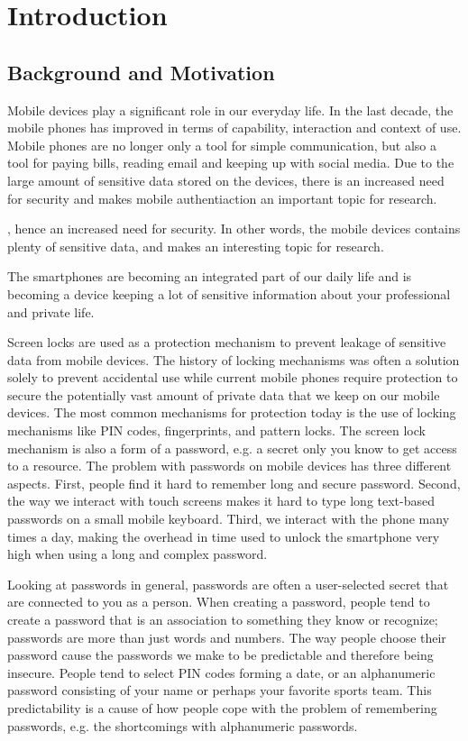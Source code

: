 \chapter{Introduction}\label{chap:introduction}
	
	\clearpage
	\section{Background and Motivation} \label{sec:backgroundandmotivation}
		Mobile devices play a significant role in our everyday life. In the last decade, the mobile phones has improved in terms of capability, interaction and context of use. Mobile phones are no longer only a tool for simple communication, but also a tool for paying bills, reading email and keeping up with social media. Due to the large amount of sensitive data stored on the devices, there is an increased need for security and makes mobile authentiaction an important topic for research.
    
    , hence an increased need for security. In other words, the mobile devices contains plenty of sensitive data, and makes an interesting topic for research.
    
    
    The smartphones are becoming an integrated part of our daily life and is becoming a device keeping a lot of sensitive information about your professional and private life.

		Screen locks are used as a protection mechanism to prevent leakage of sensitive data from mobile devices. The history of locking mechanisms was often a solution solely to prevent accidental use while current mobile phones require protection to secure the potentially vast amount of private data that we keep on our mobile devices. The most common mechanisms for protection today is the use of locking mechanisms like PIN codes, fingerprints, and pattern locks. The screen lock mechanism is also a form of a password, e.g. a secret only you know to get access to a resource. The problem with passwords on mobile devices has three different aspects. First, people find it hard to remember long and secure password. Second, the way we interact with touch screens makes it hard to type long text-based passwords on a small mobile keyboard. Third, we interact with the phone many times a day, making the overhead in time used to unlock the smartphone very high when using a long and complex password.

		Looking at passwords in general, passwords are often a user-selected secret that are connected to you as a person. When creating a password, people tend to create a password that is an association to something they know or recognize; passwords are more than just words and numbers. The way people choose their password cause the passwords we make to be predictable and therefore being insecure. People tend to select PIN codes forming a date, or an alphanumeric password consisting of your name or perhaps your favorite sports team. This predictability is a cause of how people cope with the problem of remembering passwords, e.g. the shortcomings with alphanumeric passwords. 

